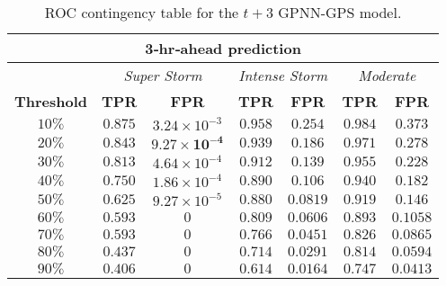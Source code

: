 \begin{table}[ht]
	\centering
	\caption{ROC contingency table for the $t+3$ GPNN-GPS model.}
	\label{table:rocgpnn3h}
	\begin{tabular}
		{c| c c | c c | c c}
		\hline
		\multicolumn{7}{c}{\textbf{3‐hr‐ahead prediction}} \\ 
		\hline
		 & \multicolumn{2}{c}{\textit{Super Storm}} & \multicolumn{2}{c}{\textit{Intense Storm}} & \multicolumn{2}{c}{\textit{Moderate}} \\ 
		\hline
		\textbf{Threshold} & \textbf{TPR} & \textbf{FPR} & \textbf{TPR} & \textbf{FPR} & \textbf{TPR} & \textbf{FPR} \\ 
		\hline
		$10\%$ & $0.875$ & $3.24\times10^{-3}$ & $0.958$ & $0.254$ & $0.984$ & $0.373$ \\ 
		$20\%$ & $\mathbf{0.843}$ & $\mathbf{9.27\times10^{-4}}$ & $0.939$ & $0.186$ & $0.971$ & $0.278$ \\ 
		$30\%$ & $0.813$ & $4.64\times10^{-4}$ & $0.912$ & $0.139$ & $0.955$ & $0.228$ \\ 
		$40\%$ & $0.750$ & $1.86\times10^{-4}$ & $\mathbf{0.890}$ & $\mathbf{0.106}$ & $0.940$ & $0.182$ \\ 
		$50\%$ & $0.625$ & $9.27\times10^{-5}$ & $0.880$ & $0.0819$ & $0.919$ & $0.146$ \\ 
		$60\%$ & $0.593$ & $0$ & $0.809$ & $0.0606$ & $\mathbf{0.893}$ & $\mathbf{0.1058}$ \\ 
		$70\%$ & $0.593$ & $0$ & $0.766$ & $0.0451$ & $0.826$ & $0.0865$ \\ 
		$80\%$ & $0.437$ & $0$ & $0.714$ & $0.0291$ & $0.814$ & $0.0594$ \\ 
		$90\%$ & $0.406$ & $0$ & $0.614$ & $0.0164$ & $0.747$ & $0.0413$\\
		\hline
	\end{tabular}
\end{table}


